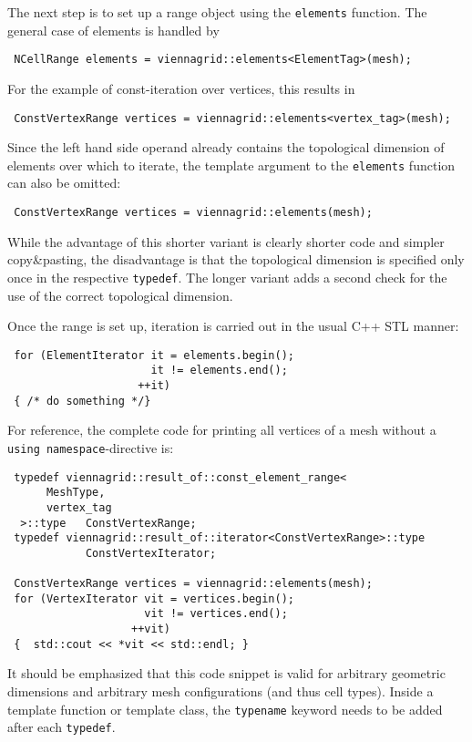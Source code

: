 The next step is to set up a range object using the \lstinline|elements| function.
The general case of elements is handled by
\begin{lstlisting}
 NCellRange elements = viennagrid::elements<ElementTag>(mesh);
\end{lstlisting}
For the example of const-iteration over vertices, this results in
\begin{lstlisting}
 ConstVertexRange vertices = viennagrid::elements<vertex_tag>(mesh);
\end{lstlisting}
Since the left hand side operand already contains the topological dimension of elements over which to iterate, 
the template argument to the \lstinline|elements| function can also be omitted:
\begin{lstlisting}
 ConstVertexRange vertices = viennagrid::elements(mesh);
\end{lstlisting}
While the advantage of this shorter variant is clearly shorter code and simpler copy\&pasting, the disadvantage is that the topological dimension is specified only once in the respective \lstinline|typedef|. The longer variant adds a second check for the use of the correct topological dimension.

Once the range is set up, iteration is carried out in the usual C++ STL manner:
\begin{lstlisting}
 for (ElementIterator it = elements.begin();
                      it != elements.end();
                    ++it)
 { /* do something */}
\end{lstlisting}
For reference, the complete code for printing all vertices of a mesh without a \lstinline|using namespace|-directive is:
\begin{lstlisting}
 typedef viennagrid::result_of::const_element_range<
      MeshType,
      vertex_tag
  >::type   ConstVertexRange;
 typedef viennagrid::result_of::iterator<ConstVertexRange>::type
            ConstVertexIterator;

 ConstVertexRange vertices = viennagrid::elements(mesh);
 for (VertexIterator vit = vertices.begin();
                     vit != vertices.end();
                   ++vit)
 {  std::cout << *vit << std::endl; }
\end{lstlisting}
It should be emphasized that this code snippet is valid for arbitrary geometric dimensions and arbitrary mesh configurations (and thus cell types). Inside a template function or template class, the \lstinline|typename| keyword needs to be added after each \lstinline|typedef|.



